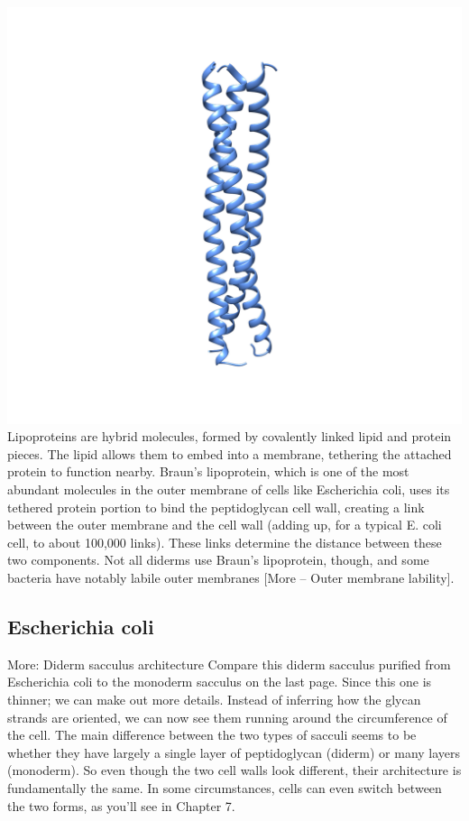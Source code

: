 \documentclass[]{book}
\begin{document}
\includegraphics{img/02_schematic/2_3_1_BLP.png} Lipoproteins are hybrid
molecules, formed by covalently linked lipid and protein pieces. The
lipid allows them to embed into a membrane, tethering the attached
protein to function nearby. Braun's lipoprotein, which is one of the
most abundant molecules in the outer membrane of cells like Escherichia
coli, uses its tethered protein portion to bind the peptidoglycan cell
wall, creating a link between the outer membrane and the cell wall
(adding up, for a typical E. coli cell, to about 100,000 links). These
links determine the distance between these two components. Not all
diderms use Braun's lipoprotein, though, and some bacteria have notably
labile outer membranes {[}More -- Outer membrane lability{]}.

\subsection{Escherichia coli}\label{escherichia-coli}

More: Diderm sacculus architecture Compare this diderm sacculus purified
from Escherichia coli to the monoderm sacculus on the last page. Since
this one is thinner; we can make out more details. Instead of inferring
how the glycan strands are oriented, we can now see them running around
the circumference of the cell. The main difference between the two types
of sacculi seems to be whether they have largely a single layer of
peptidoglycan (diderm) or many layers (monoderm). So even though the two
cell walls look different, their architecture is fundamentally the same.
In some circumstances, cells can even switch between the two forms, as
you'll see in Chapter 7.
\end{document}

